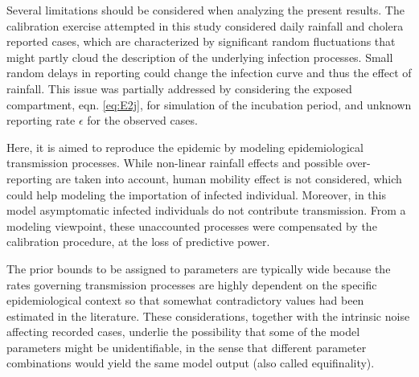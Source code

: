 Several limitations should be considered when analyzing the present results. The calibration exercise attempted in this study considered daily rainfall and cholera reported cases, which are characterized by significant random fluctuations that might partly cloud the description of the underlying infection processes. 
Small random delays in reporting could change the infection curve and thus the effect of rainfall. This issue was partially addressed by considering the exposed compartment, eqn. \eqref{eq:E2j}, for simulation of the incubation period, and unknown reporting rate $\epsilon$ for the observed cases.

Here, it is aimed to reproduce the epidemic by modeling epidemiological transmission processes. %
While non-linear rainfall effects and possible over-reporting are taken into account, human mobility effect\cite[-4\baselineskip]{Gatto:GeneralizedReproductionNumbers:2012,Bertuzzo:SpatiallyExplicitModels:2010,Mari:PredictiveAbilityMechanistic:2015,Perez-Saez:ClimatedrivenEndemicCholera:2017} is not considered, which could help modeling the importation of infected individual.  Moreover, in this model asymptomatic infected individuals do not contribute transmission. From a modeling viewpoint, these unaccounted processes were compensated by the calibration procedure, at the loss of predictive power.

The prior bounds to be assigned to parameters are typically wide\cite{Akman:ExaminationModelsCholera:2016} because the rates governing transmission processes are highly dependent on the specific epidemiological context so that somewhat contradictory values had been estimated in the literature. These considerations, together with the intrinsic noise affecting recorded cases, underlie the possibility that some of the model parameters might be unidentifiable\cite{Eisenberg:IdentifiabilityEstimationMultiple:2013}, in the sense that different parameter combinations would yield the same model output (also called equifinality). 

